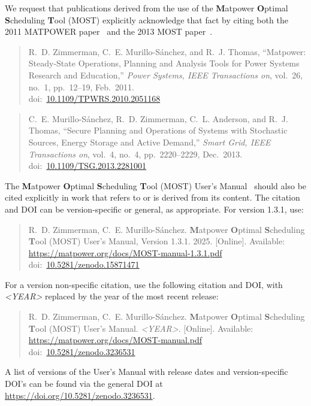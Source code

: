 \documentclass[12pt]{article}
\newcommand{\matpower}[0]{{\sc Matpower}}
\newcommand{\most}[0]{{MOST}}
\newcommand{\mostname}[0]{{{\bf M}{\sc atpower} \textbf{O}ptimal \textbf{S}cheduling \textbf{T}ool}}
\newcommand{\doi}[1]{doi:~\href{https://doi.org/#1}{#1}}
\numberwithin{equation}{section}
\numberwithin{table}{section}
\numberwithin{figure}{section}
\begin{document}
We request that publications derived from the use of the \mostname{} (\most{}) explicitly acknowledge that fact by citing both the 2011 MATPOWER paper~\cite{zimmerman2011} and the 2013 MOST paper~\cite{murillo-sanchez2013a}.

\begin{quote}
\footnotesize
R.~D. Zimmerman, C.~E. Murillo-S{\'a}nchez, and R.~J. Thomas, ``\matpower{}: Steady-State Operations, Planning and Analysis Tools for Power Systems Research and Education,'' \emph{Power Systems, IEEE Transactions on}, vol.~26, no.~1, pp.~12--19, Feb.~2011.\\
\doi{10.1109/TPWRS.2010.2051168}
\end{quote}

\begin{quote}
\footnotesize
C.~E. Murillo-S{\'a}nchez, R.~D. Zimmerman, C.~L. Anderson, and R.~J. Thomas, ``Secure Planning and Operations of Systems with Stochastic Sources, Energy Storage and Active Demand,'' \emph{Smart Grid, IEEE Transactions on}, vol.~4, no.~4, pp.~2220--2229, Dec.~2013.\\
\doi{10.1109/TSG.2013.2281001}
\end{quote}

The \mostname{} (\most) User's Manual~\cite{most_manual} should also be
cited explicitly in work that refers to or is derived from its content.
The citation and DOI can be version-specific or general, as appropriate.
For version 1.3.1, use:

\begin{quote}
\footnotesize
R.~D. Zimmerman, C.~E. Murillo-S{\'a}nchez. \mostname{} (\most{}) User's Manual, Version 1.3.1. 2025. [Online]. Available: \url{https://matpower.org/docs/MOST-manual-1.3.1.pdf}\\
\doi{10.5281/zenodo.15871471}
\end{quote}
For a version non-specific citation, use the following citation and DOI,
with \emph{\textless{}YEAR\textgreater{}} replaced by the year of the most recent release:

\begin{quote}
\footnotesize
R.~D. Zimmerman, C.~E. Murillo-S{\'a}nchez. \mostname{} (\most{}) User's Manual. \emph{\textless{}YEAR\textgreater{}}.
[Online]. Available: \url{https://matpower.org/docs/MOST-manual.pdf}\\
\doi{10.5281/zenodo.3236531}
\end{quote}
A list of versions of the User's Manual with release dates and
version-specific DOI's can be found via the general DOI at
\url{https://doi.org/10.5281/zenodo.3236531}.
\end{document}
